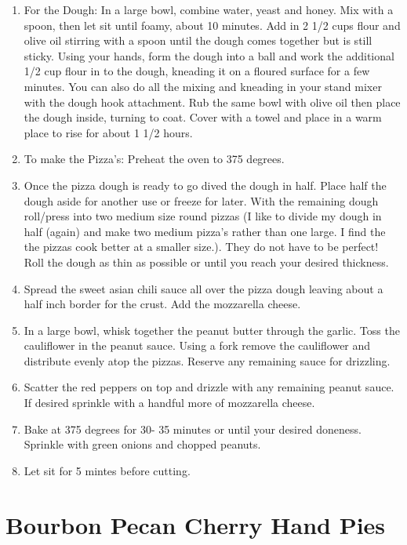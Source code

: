 \documentclass[
  letterpaper,
  DIV=11,
  numbers=noendperiod,
  titlepage=false]{scrreprt}
\providecommand{\tightlist}{%
  \setlength{\itemsep}{0pt}\setlength{\parskip}{0pt}}\usepackage{longtable,booktabs,array}
\begin{document}
\begin{enumerate}
\def\labelenumi{\arabic{enumi}.}
\tightlist
\item
  For the Dough: In a large bowl, combine water, yeast and honey. Mix
  with a spoon, then let sit until foamy, about 10 minutes. Add in 2 1/2
  cups flour and olive oil stirring with a spoon until the dough comes
  together but is still sticky. Using your hands, form the dough into a
  ball and work the additional 1/2 cup flour in to the dough, kneading
  it on a floured surface for a few minutes. You can also do all the
  mixing and kneading in your stand mixer with the dough hook
  attachment. Rub the same bowl with olive oil then place the dough
  inside, turning to coat. Cover with a towel and place in a warm place
  to rise for about 1 1/2 hours.
\item
  To make the Pizza's: Preheat the oven to 375 degrees.
\item
  Once the pizza dough is ready to go dived the dough in half. Place
  half the dough aside for another use or freeze for later. With the
  remaining dough roll/press into two medium size round pizzas (I like
  to divide my dough in half (again) and make two medium pizza's rather
  than one large. I find the the pizzas cook better at a smaller size.).
  They do not have to be perfect! Roll the dough as thin as possible or
  until you reach your desired thickness.
\item
  Spread the sweet asian chili sauce all over the pizza dough leaving
  about a half inch border for the crust. Add the mozzarella cheese.
\item
  In a large bowl, whisk together the peanut butter through the garlic.
  Toss the cauliflower in the peanut sauce. Using a fork remove the
  cauliflower and distribute evenly atop the pizzas. Reserve any
  remaining sauce for drizzling.
\item
  Scatter the red peppers on top and drizzle with any remaining peanut
  sauce. If desired sprinkle with a handful more of mozzarella cheese.
\item
  Bake at 375 degrees for 30- 35 minutes or until your desired doneness.
  Sprinkle with green onions and chopped peanuts.
\item
  Let sit for 5 mintes before cutting.
\end{enumerate}


\chapter{Bourbon Pecan Cherry Hand
Pies}\label{bourbon-pecan-cherry-hand-pies}
\end{document}
